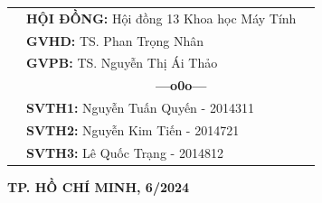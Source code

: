 \documentclass[a4paper]{article}
\theoremstyle{definition}
\begin{document}
\begin{titlepage}
\begin{table}[h]
\begin{tabular}{rll}
\hspace{5 cm} &  \textbf{\Large HỘI ĐỒNG:} {\Large Hội đồng 13 Khoa học Máy Tính}
\\
\hspace{3 cm} &   \textbf{\Large GVHD:} {\Large TS. Phan Trọng Nhân} 
\\
\hspace{3 cm}  &   \textbf{\Large GVPB:} {\Large TS. Nguyễn Thị Ái Thảo}
\\
\hspace{3 cm} &     \textbf{$\;$ $\;$$\;$$\;$$\;$$\;$$\;$$\;$$\;$$\;$$\;$$\;$$\;$$\;$$\;$$\;$$\;$$\;$$\;$$\;$$\;$$\;$$\;$$\;$$\;$$\;$$\;$$\;$$\;$$\;$$\;$$\;$$\;$$\;$ \Large ---o0o---} 
\\
\hspace{3 cm} &   \textbf{\Large SVTH1:} {\Large Nguyễn Tuấn Quyến - 2014311}
\\
\hspace{3 cm}&   \textbf{\Large SVTH2:}  {\Large Nguyễn Kim Tiến - 2014721}
\\
\hspace{3 cm} &   \textbf{\Large SVTH3:}  {\Large Lê Quốc Trạng - 2014812}
\\
\end{tabular}
\end{table}

\vspace{2cm}
\begin{center}
\Large \textbf{TP. HỒ CHÍ MINH, 6/2024}
\end{center}
\end{titlepage}




\newpage
{}

\newpage
\tableofcontents
\newpage
\listoffigures
\newpage
\listoftables
\newpage

\newpage

\newpage


\newpage


\newpage


\newpage


\newpage


\newpage



\newpage




\end{document}
